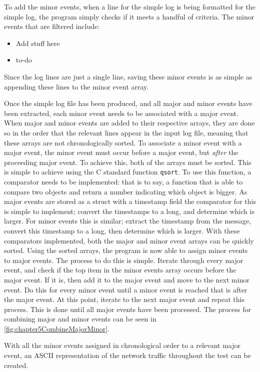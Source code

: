 To add the minor events, when a line for the simple log is being formatted for the simple log, the program simply checks if it meets a handful of criteria.
The minor events that are filtered include:
\begin{itemize}
    \item Add stuff here
    \item to-do
\end{itemize}
Since the log lines are just a single line, saving these minor events is as simple as appending these lines to the minor event array.


Once the simple log file has been produced, and all major and minor events have been extracted, each minor event needs to be associated with a major event.
When major and minor events are added to their respective arrays, they are done so in the order that the relevant lines appear in the input log file, meaning that these arrays are not chronologically sorted.
To associate a minor event with a major event, the minor event must occur before a major event, but \emph{after} the proceeding major event.
To achieve this, both of the arrays must be sorted.
This is simple to achieve using the C standard function \verb|qsort|.
To use this function, a comparator needs to be implemented: that is to say, a function that is able to compare two objects and return a number indicating which object is bigger.
As major events are stored as a struct with a timestamp field the comparator for this is simple to implement; convert the timestamps to a long, and determine which is larger.
For minor events this is similar; extract the timestamp from the message, convert this timestamp to a long, then determine which is larger.
With these comparators implemented, both the major and minor event arrays can be quickly sorted.
Using the sorted arrays, the program is now able to assign minor events to major events.
The process to do this is simple. Iterate through every major event, and check if the top item in the minor events array occurs before the major event.
If it is, then add it to the major event and move to the next minor event. 
Do this for every minor event until a minor event is reached that is after the major event.
At this point, iterate to the next major event and repeat this process.
This is done until all major events have been processed.
The process for combining major and minor events can be seen in \figurename{ \ref{fig:chapter5CombineMajorMinor}}.

With all the minor events assigned in chronological order to a relevant major event, an ASCII representation of the network traffic throughout the test can be created.

